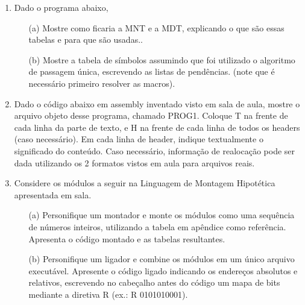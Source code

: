 \begin{enumerate}[resume]

    \item
    Dado o programa abaixo,    

    \begin{itemize}
        \item [(a)]
        Mostre como ficaria a MNT e a MDT, 
        explicando o que são essas tabelas e para que são usadas..

        \item [(b)]
        Mostre a tabela de símbolos assumindo que foi utilizado
        o algoritmo de passagem única, escrevendo as listas de pendências.
        (note que é necessário primeiro resolver as macros).
    \end{itemize}    

    \item
    Dado o código abaixo em assembly inventado visto em sala de aula,
    mostre o arquivo objeto desse programa, chamado PROG1.
    Coloque T na frente de cada linha da parte de texto,
    e H na frente de cada linha de todos os headers (caso necessário).
    Em cada linha de header, indique textualmente o significado do conteúdo.
    Caso necessário, informação de realocação pode ser dada 
    utilizando os 2 formatos vistos em aula para arquivos reais.

    \item
    Considere os módulos a seguir na Linguagem de Montagem Hipotética apresentada em sala.
    \begin{multicols}{2}
    \end{multicols}

    \begin{itemize}
        \item [(a)]
        Personifique um montador e monte os módulos como uma sequência de números inteiros,
        utilizando a tabela em apêndice como referência. 
        Apresenta o código montado e as tabelas resultantes.

        \item [(b)]
        Personifique um ligador e combine os módulos em um único arquivo executável.
        Apresente o código ligado indicando os endereços absolutos e relativos,
        escrevendo no cabeçalho antes do código um mapa de bits mediante a diretiva R
        (ex.: R 0101010001). 
    \end{itemize}


\end{enumerate}
